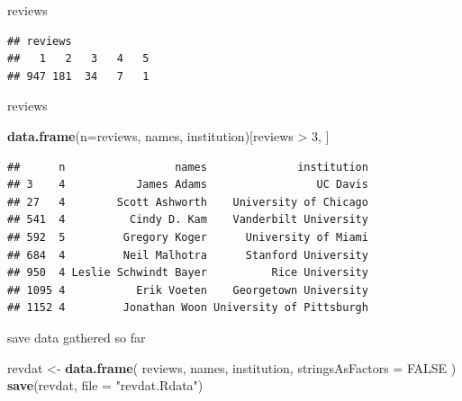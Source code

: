 \documentclass[ignorenonframetext,]{beamer}
\newenvironment{Shaded}{\begin{snugshade}}{\end{snugshade}}
\newcommand{\KeywordTok}[1]{\textcolor[rgb]{0.13,0.29,0.53}{\textbf{{#1}}}}
\newcommand{\DataTypeTok}[1]{\textcolor[rgb]{0.13,0.29,0.53}{{#1}}}
\newcommand{\DecValTok}[1]{\textcolor[rgb]{0.00,0.00,0.81}{{#1}}}
\newcommand{\CharTok}[1]{\textcolor[rgb]{0.31,0.60,0.02}{{#1}}}
\newcommand{\StringTok}[1]{\textcolor[rgb]{0.31,0.60,0.02}{{#1}}}
\newcommand{\OtherTok}[1]{\textcolor[rgb]{0.56,0.35,0.01}{{#1}}}
\newcommand{\NormalTok}[1]{{#1}}
\begin{document}
\begin{frame}[fragile]{reviews}

\begin{Shaded}
\end{Shaded}

\begin{verbatim}
## reviews
##   1   2   3   4   5 
## 947 181  34   7   1
\end{verbatim}

\end{frame}

\begin{frame}[fragile]{reviews}

\begin{Shaded}
\begin{Highlighting}[]
\KeywordTok{data.frame}\NormalTok{(}\DataTypeTok{n=}\NormalTok{reviews, names, institution)[reviews >}\StringTok{ }\DecValTok{3}\NormalTok{, ]}
\end{Highlighting}
\end{Shaded}

\begin{verbatim}
##      n                 names              institution
## 3    4           James Adams                 UC Davis
## 27   4        Scott Ashworth    University of Chicago
## 541  4          Cindy D. Kam    Vanderbilt University
## 592  5         Gregory Koger      University of Miami
## 684  4         Neil Malhotra      Stanford University
## 950  4 Leslie Schwindt Bayer          Rice University
## 1095 4           Erik Voeten    Georgetown University
## 1152 4         Jonathan Woon University of Pittsburgh
\end{verbatim}

\end{frame}

\begin{frame}[fragile]{save data gathered so far}

\begin{Shaded}
\begin{Highlighting}[]
\NormalTok{revdat <-}\StringTok{ }\KeywordTok{data.frame}\NormalTok{(}
  \NormalTok{reviews, }
  \NormalTok{names, }
  \NormalTok{institution, }
  \DataTypeTok{stringsAsFactors =} \OtherTok{FALSE}
\NormalTok{)}
\KeywordTok{save}\NormalTok{(revdat, }\DataTypeTok{file =} \StringTok{"revdat.Rdata"}\NormalTok{)}
\end{Highlighting}
\end{Shaded}

\end{frame}
\end{document}
